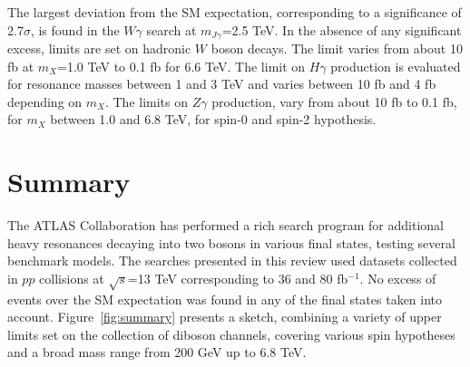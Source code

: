 \documentclass{PoS}
\begin{document}
The largest deviation from the SM expectation, corresponding to a significance of 2.7$\sigma$, is found in the $W\gamma$ search at $m_{J \gamma}$=2.5 TeV.
In the absence of any significant excess, limits are set on hadronic $W$ boson decays.
The limit varies from about 10 fb at $m_X$=1.0 TeV to 0.1 fb for 6.6 TeV. %
The limit on $H\gamma$ production is evaluated for resonance masses between 1 and 3 TeV and varies between 10 fb and 4 fb depending on $m_X$.
The limits on $Z\gamma$ production, vary from about 10 fb to 0.1 fb, for $m_X$ between 1.0 and 6.8 TeV, for spin-0 and spin-2 hypothesis. %

\vspace*{-4mm}
\section{Summary}
\label{sec:sum}
\vspace*{-2mm}
The ATLAS Collaboration has performed a rich search program for additional heavy resonances decaying into two bosons in various final states, testing several benchmark models.
The searches presented in this review used datasets collected in $pp$ collisions at $\sqrt{s}$=13 TeV corresponding to 36 and 80 fb$^{-1}$.
No excess of events over the SM expectation was found in any of the final states taken into account. 
Figure~\ref{fig:summary} presents a sketch, combining a variety of upper limits set on the collection of diboson channels, covering various spin hypotheses and a broad mass range from 200 GeV up to 6.8 TeV.
\end{document}
